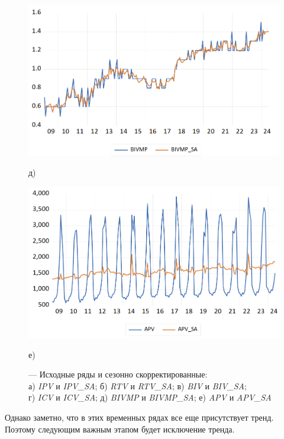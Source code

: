\documentclass[a4paper, 14pt]{extreport}
\numberwithin{equation}{subsection}
\numberwithin{equation}{section}
\begin{document}
\begin{figure}[h]
		\begin{minipage}{0.5\textwidth}
			\centering
		\includegraphics[scale=0.25]{images/img06}
			\caption*{д)}
		\end{minipage}%
		\hfill %
		\begin{minipage}{0.5\textwidth}
			\centering
		\includegraphics[scale=0.25]{images/img07}
			\caption*{е)}
		\end{minipage}
		\caption{\centering --- Исходные ряды и сезонно скорректированные:\\ а) \textit{IPV} и \textit{IPV\_SA}; б) \textit{RTV} и \textit{RTV\_SA}; в) \textit{BIV} и \textit{BIV\_SA};\\ г) \textit{ICV} и \textit{ICV\_SA}; д) \textit{BIVMP} и \textit{BIVMP\_SA}; е) \textit{APV} и \textit{APV\_SA}}
		\label{fig:sa1}
	\end{figure}
	
	Однако заметно, что в этих временных рядах все еще присутствует тренд. Поэтому следующим важным этапом будет исключение тренда.
	
\end{document}
